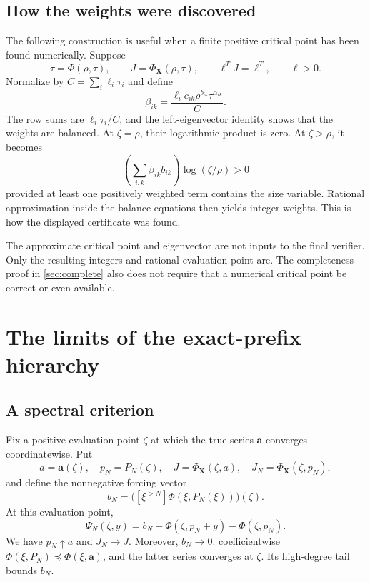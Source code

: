 \documentclass[11pt,a4paper]{article}
\theoremstyle{definition}
\theoremstyle{remark}
\newcommand{\bA}{\boldsymbol a}
\newcommand{\bX}{\boldsymbol X}
\newcommand{\tail}[2]{[\xi^{>#1}]#2}
\begin{document}
\subsection{How the weights were discovered}
The following construction is useful when a finite positive critical point
has been found numerically. Suppose
\[
 \tau=\Phi(\rho,\tau),\qquad
 J=\Phi_{\bX}(\rho,\tau),\qquad
 \ell^TJ=\ell^T,\qquad \ell>0.
\]
Normalize by $C=\sum_i\ell_i\tau_i$ and define
\[
 \beta_{ik}=
 \frac{\ell_i c_{ik}\rho^{b_{ik}}\tau^{\alpha_{ik}}}{C}.
\]
The row sums are $\ell_i\tau_i/C$, and the left-eigenvector identity shows
that the weights are balanced. At $\zeta=\rho$, their logarithmic product
is zero. At $\zeta>\rho$, it becomes
\[
 \left(\sum_{i,k}\beta_{ik}b_{ik}\right)\log(\zeta/\rho)>0
\]
provided at least one positively weighted term contains the size variable.
Rational approximation inside the balance equations then yields integer
weights. This is how the displayed certificate was found.

The approximate critical point and eigenvector are not inputs to the final
verifier. Only the resulting integers and rational evaluation point are.
The completeness proof in \cref{sec:complete} also does not require that a
numerical critical point be correct or even available.

\section{The limits of the exact-prefix hierarchy}
\label{sec:stability}

\subsection{A spectral criterion}
Fix a positive evaluation point $\zeta$ at which the true series $\bA$
converges coordinatewise. Put
\[
 a=\bA(\zeta),\quad p_N=P_N(\zeta),\quad
 J=\Phi_{\bX}(\zeta,a),\quad
 J_N=\Phi_{\bX}(\zeta,p_N),
\]
and define the nonnegative forcing vector
\[
 b_N=\bigl(\tail{N}{\Phi(\xi,P_N(\xi))}\bigr)(\zeta).
\]
At this evaluation point,
\begin{equation}\label{eq:tail-numeric}
 \Psi_N(\zeta,y)=b_N+
       \Phi(\zeta,p_N+y)-\Phi(\zeta,p_N).
\end{equation}
We have $p_N\uparrow a$ and $J_N\to J$. Moreover, $b_N\to0$:
coefficientwise $\Phi(\xi,P_N)\preceq\Phi(\xi,\bA)$, and the latter
series converges at $\zeta$. Its high-degree tail bounds $b_N$.
\end{document}

